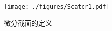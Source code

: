 

\begin{figure}[ht]
\centering
\texttt{[image: ./figures/Scater1.pdf]}
\caption{微分截面的定义} \label{Scater_fig1}
\end{figure}
